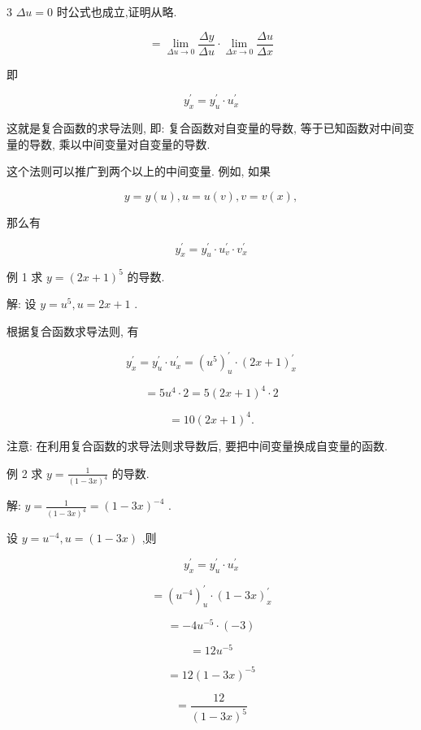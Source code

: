 \documentclass[10pt]{article}
\begin{document}
3 \({\Delta u} = 0\) 时公式也成立,证明从略.

\[
= \mathop{\lim }\limits_{{{\Delta u} \rightarrow 0}}\frac{\Delta y}{\Delta u} \cdot \mathop{\lim }\limits_{{{\Delta x} \rightarrow 0}}\frac{\Delta u}{\Delta x}
\]

即

\[
{y}_{x}^{\prime } = {y}_{u}^{\prime } \cdot {u}_{x}^{\prime }
\]

这就是复合函数的求导法则, 即: 复合函数对自变量的导数, 等于已知函数对中间变量的导数, 乘以中间变量对自变量的导数.

这个法则可以推广到两个以上的中间变量. 例如, 如果

\[
y = y\left( u\right) ,u = u\left( v\right) ,v = v\left( x\right) ,
\]

那么有

\[
{y}_{x}^{\prime } = {y}_{u}^{\prime } \cdot {u}_{v}^{\prime } \cdot {v}_{x}^{\prime }
\]

例 1 求 \(y = {\left( 2x + 1\right) }^{5}\) 的导数.

解: 设 \(y = {u}^{5},u = {2x} + 1\) .

根据复合函数求导法则, 有

\[
{y}_{x}^{\prime } = {y}_{u}^{\prime } \cdot {u}_{x}^{\prime } = {\left( {u}^{5}\right) }_{u}^{\prime } \cdot {\left( 2x + 1\right) }_{x}^{\prime }
\]

\[
= 5{u}^{4} \cdot 2 = 5{\left( 2x + 1\right) }^{4} \cdot 2
\]

\[
= {10}{\left( 2x + 1\right) }^{4}\text{.}
\]

注意: 在利用复合函数的求导法则求导数后, 要把中间变量换成自变量的函数.

例 2 求 \(y = \frac{1}{{\left( 1 - 3x\right) }^{4}}\) 的导数.

解: \(y = \frac{1}{{\left( 1 - 3x\right) }^{4}} = {\left( 1 - 3x\right) }^{-4}\) .

设 \(y = {u}^{-4},u = \left( {1 - {3x}}\right)\) ,则

\[
{y}_{x}^{\prime } = {y}_{u}^{\prime } \cdot {u}_{x}^{\prime }
\]

\[
= {\left( {u}^{-4}\right) }_{u}^{\prime } \cdot {\left( 1 - 3x\right) }_{x}^{\prime }
\]

\[
= - 4{u}^{-5} \cdot \left( {-3}\right)
\]

\[
= {12}{u}^{-5}
\]

\[
= {12}{\left( 1 - 3x\right) }^{-5}
\]

\[
= \frac{12}{{\left( 1 - 3x\right) }^{5}}
\]
\end{document}

